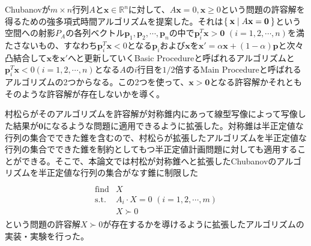 Chubanovが$m \times n$行列$A$と$\mathbf{x} \in \mathbb{R}^n$に対して、$A \mathbf{x} = 0, \mathbf{x} \geq 0$という問題の許容解を得るための強多項式時間アルゴリズムを提案した。それは$\Set{\mathbf{x} | A \mathbf{x} = \mathbf{0}}$という空間への射影$P_A$の各列ベクトル$\mathbf{p}_1, \mathbf{p}_2, \cdots, \mathbf{p}_n$の中で$\mathbf{p}_i^T \mathbf{x} > \mathbf{0} \,\, (i = 1, 2, \cdots, n)$を満たさないもの、すなわち$\mathbf{p}_i^T \mathbf{x} < 0$となる$\mathbf{p}_i$および$\mathbf{x}$を$\mathbf{x}' = \alpha \mathbf{x} + (1 - \alpha) \mathbf{p}$と次々凸結合して$\mathbf{x}$を$\mathbf{x}'$へと更新していくBasic Procedureと呼ばれるアルゴリズムと$\mathbf{p}_i^T \mathbf{x} < 0 (i = 1, 2, \cdots, n)$となる$A$の$i$行目を$1 / 2$倍するMain Procedureと呼ばれるアルゴリズムの2つからなる。この2つを使って、$\mathbf{x} > \mathbf{0}$となる許容解かそれともそのような許容解が存在しないかを導く。

村松らがそのアルゴリズムを許容解が対称錐内にあって線型写像によって写像した結果が$\mathbf{0}$になるような問題に適用できるように拡張した\cite{SymmetricCone}。対称錐は半正定値な行列の集合でできた錐を含むので、村松らが拡張したアルゴリズムを半正定値な行列の集合でできた錐を制約としてもつ半正定値計画問題に対しても適用することができる。そこで、本論文では村松が対称錐へと拡張したChubanovのアルゴリズムを半正定値な行列の集合がなす錐に制限した
\begin{align} \label{SemidefiniteSystem}
  \begin{array}{ll} \\
    \text{find} & X \\
    \text{s.t.} & A_i \cdot X = 0 \,\, (i = 1, 2, \cdots, m) \\
                & X \succ 0
  \end{array}
\end{align}
という問題の許容解$X \succ 0$が存在するかを導けるように拡張したアルゴリズムの実装・実験を行った。
